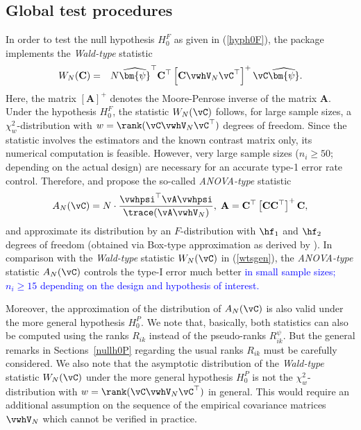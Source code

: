 \subsection{Global test procedures}
In order to test the null hypothesis $H_0^F$ as given in (\ref{hyph0F}), the 
 package implements the \textit{Wald-type} statistic 
\begin{eqnarray}
W_N(\mathbf{C}) &=& N \widehat{\bm{\psi}}^\top\mathbf{C}^\top\left[ \mathbf{C}
\vwhV_N \vC^\top  \right]^+ \vC \widehat{\bm{\psi}}. 
\label{wtsgen}
\end{eqnarray}
Here, the matrix $[\mathbf{A}]^+$ denotes the Moore-Penrose inverse of the 
matrix $\mathbf{A}$. Under the hypothesis $H_0^F$, the statistic $W_N(\vC)$ 
follows, for large sample sizes, a $\chi_w^2$-distribution with $w = \rank(\vC 
\vwhV_N \vC^\top)$ degrees of freedom. Since the statistic 
involves the estimators and the known contrast matrix only, its numerical 
computation is feasible. However, very large sample sizes ($n_i\geq 50$; 
depending on the actual design) are necessary for an accurate type-1 error 
rate control. Therefore, \cite{akritas1997nonparametric} and 
\cite{brunner2017rank} propose the so-called \textit{ANOVA-type} statistic 
\begin{eqnarray}
A_N(\vC) = N \cdot \frac{\vwhpsi^\top \vA \vwhpsi }{\trace(\vA 
           \vwhV_N)}, \; \mathbf{A} = \mathbf{C}^\top\left[ 
					 \mathbf{C} \mathbf{C}^\top  \right]^+ \mathbf{C}, \label{atsgen}
\end{eqnarray}
and approximate its distribution by an $F$-distribution with $\hf_1$ and 
$\hf_2$ degrees of freedom (obtained via Box-type approximation as derived by 
\cite{brunner1997box}). In comparison with the \textit{Wald-type} statistic 
$W_N(\vC)$ in (\ref{wtsgen}), the \textit{ANOVA-type} statistic $A_N(\vC)$ 
controls the type-I error much better \textcolor{blue}{in small sample sizes; 
$n_i\geq 15$ depending on the design and hypothesis of interest.} 

Moreover, the approximation of the distribution of $A_N(\vC)$ is also valid 
under the more general hypothesis $H_0^P$. We note that, basically, both 
statistics can also be computed using the ranks $R_{ik}$ instead of the 
pseudo-ranks $R_{ik}^\psi$. But the general remarks in Sections~\ref{nullh0P} 
regarding the usual ranks $R_{ik}$ must be carefully considered. We also note 
that the asymptotic distribution of the \textit{Wald-type} statistic $W_N(\vC)$ 
under the more general hypothesis $H_0^P$ is not the $\chi_w^2$-distribution 
with $w = \rank(\vC \vwhV_N \vC^\top)$ in general. This would require an 
additional assumption on the sequence of the empirical covariance matrices 
$\vwhV_N$ which cannot be verified in practice. 

